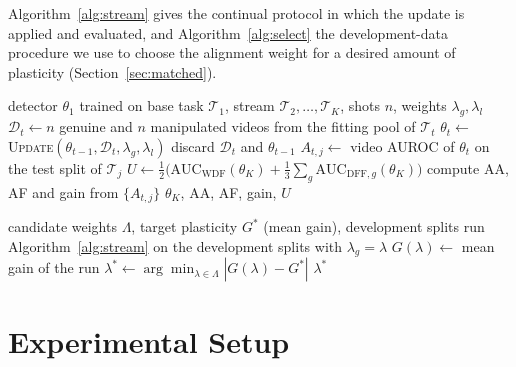 \documentclass[journal]{IEEEtran}
\begin{document}
Algorithm~\ref{alg:stream} gives the continual protocol in which the update is applied and evaluated, and Algorithm~\ref{alg:select} the development-data procedure we use to choose the alignment weight for a desired amount of plasticity (Section~\ref{sec:matched}).

\begin{algorithm}[t]
\caption{Continual updating and evaluation}
\label{alg:stream}
\footnotesize
\begin{algorithmic}[1]
\Require detector $\theta_1$ trained on base task $\mathcal{T}_1$, stream $\mathcal{T}_2,\dots,\mathcal{T}_K$, shots $n$, weights $\lambda_g,\lambda_l$
  \State $\mathcal{D}_t\gets n$ genuine and $n$ manipulated videos from the fitting pool of $\mathcal{T}_t$
  \State $\theta_t\gets$ \textsc{Update}$(\theta_{t-1},\mathcal{D}_t,\lambda_g,\lambda_l)$ 
  \State discard $\mathcal{D}_t$ and $\theta_{t-1}$ 
    \State $A_{t,j}\gets$ video AUROC of $\theta_t$ on the test split of $\mathcal{T}_j$
  \EndFor
\EndFor
\State $U\gets\frac12\big(\mathrm{AUC}_{\mathrm{WDF}}(\theta_K)+\frac13\sum_g\mathrm{AUC}_{\mathrm{DFF},g}(\theta_K)\big)$ 
\State compute AA, AF and gain from $\{A_{t,j}\}$
\State \Return $\theta_K$, AA, AF, gain, $U$
\end{algorithmic}
\end{algorithm}

\begin{algorithm}[t]
\caption{Development-selected alignment weight}
\label{alg:select}
\footnotesize
\begin{algorithmic}[1]
\Require candidate weights $\Lambda$, target plasticity $G^{*}$ (mean gain), development splits
  \State run Algorithm~\ref{alg:stream} on the development splits with $\lambda_g=\lambda$
  \State $G(\lambda)\gets$ mean gain of the run
\EndFor
\State $\lambda^{*}\gets\arg\min_{\lambda\in\Lambda}|G(\lambda)-G^{*}|$ 
\State \Return $\lambda^{*}$ 
\end{algorithmic}
\end{algorithm}


\section{Experimental Setup}
\label{sec:setup}
\end{document}
